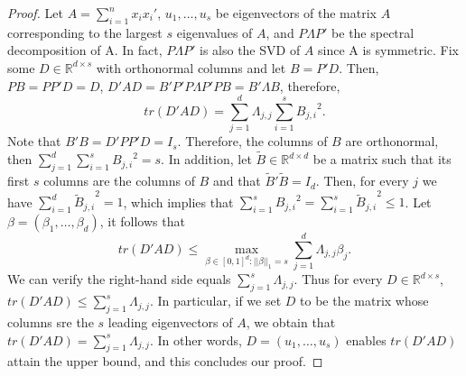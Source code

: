 \begin{proof}
Let $A=\sum\limits_{i=1}^{n}x_ix_i'$, $u_1,\dots,u_s$ be eigenvectors of the matrix $A$ corresponding to the largest $s$ eigenvalues of $A$, and $P\Lambda P'$ be the spectral decomposition of A. In fact, $P\Lambda P'$ is also the SVD of $A$ since A is symmetric. Fix some $D\in {\mathbb R}^{d\times s}$ with orthonormal columns and let $B=P'D$. Then, $PB=PP'D=D$, $D'AD=B'P'P\Lambda P'PB=B'\Lambda B$, therefore, 
$$tr(D'AD)=\sum\limits_{j=1}^{d}\Lambda_{j,j}\sum\limits_{i=1}^{s}{B_{j,i}}^2.$$
Note that $B'B=D'PP'D=I_s$. Therefore, the columns of $B$ are orthonormal, then 
$\sum\limits_{j=1}^{d}\sum\limits_{i=1}^{s}{B_{j,i}}^2=s$.
In addition, let $\tilde B\in{\mathbb R}^{d\times d}$ be a matrix such that its first $s$ columns are the columns of $B$ and that ${\tilde B}'\tilde B=I_d$. Then, for every $j$ we have $\sum\limits_{i=1}^{d}{{\tilde B}_{j,i}}^2=1$, which implies that $\sum\limits_{i=1}^{s}{B_{j,i}}^2=\sum\limits_{i=1}^{s}{{\tilde B}_{j,i}}^2\leq1$. Let $\beta=(\beta_1,\dots,\beta_d)$, it follows that 
$$tr(D'AD)\leq\max\limits_{\beta\in[0,1]^d:||\beta||_1= s}\sum\limits_{j=1}^{d}\Lambda_{j,j}\beta_j.$$
We can verify the right-hand side equals $\sum\limits_{j=1}^{s}\Lambda_{j,j}$. Thus for every $D\in {\mathbb R}^{d\times s}$, $tr(D'AD)\leq\sum\limits_{j=1}^{s}\Lambda_{j,j}$. In particular, if we set $D$ to be the matrix whose columns sre the $s$ leading eigenvectors of $A$, we obtain that $tr(D'AD)=\sum\limits_{j=1}^{s}\Lambda_{j,j}$. In other words, $D=(u_1,\dots,u_s)$ enables $tr(D'AD)$ attain the upper bound, and this concludes our proof.



\end{proof}



